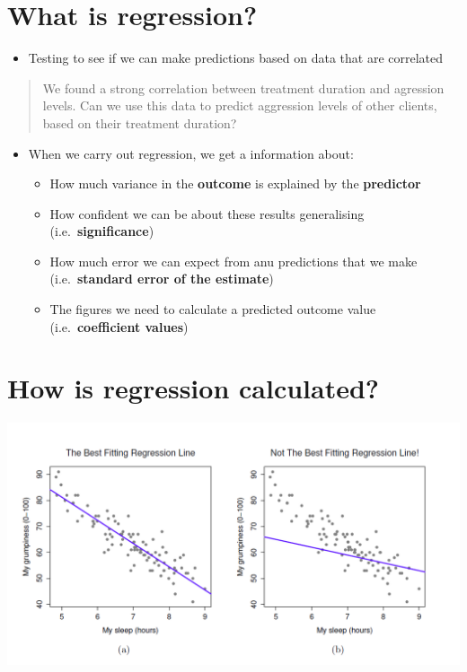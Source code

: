 \documentclass[
]{book}
\providecommand{\tightlist}{%
  \setlength{\itemsep}{0pt}\setlength{\parskip}{0pt}}
\begin{document}
\hypertarget{what-is-regression}{%
\section{What is regression?}\label{what-is-regression}}

\begin{itemize}
\tightlist
\item
  Testing to see if we can make predictions based on data that are correlated
\end{itemize}

\begin{quote}
We found a strong correlation between treatment duration and agression levels. Can we use this data to predict aggression levels of other clients, based on their treatment duration?
\end{quote}

\begin{itemize}
\tightlist
\item
  When we carry out regression, we get a information about:

  \begin{itemize}
  \tightlist
  \item
    How much variance in the \textbf{outcome} is explained by the \textbf{predictor}
  \item
    How confident we can be about these results generalising (i.e.~\textbf{significance})
  \item
    How much error we can expect from anu predictions that we make (i.e.~\textbf{standard error of the estimate})
  \item
    The figures we need to calculate a predicted outcome value (i.e.~\textbf{coefficient values})
  \end{itemize}
\end{itemize}

\hypertarget{how-is-regression-calculated}{%
\section{How is regression calculated?}\label{how-is-regression-calculated}}

\begin{center}\includegraphics[width=14.88in]{img/bestfit} \end{center}
\end{document}
